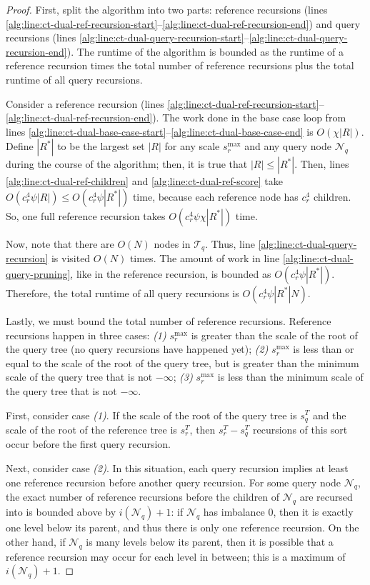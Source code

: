 \begin{proof}
First, split the algorithm into two parts: reference recursions (lines
\ref{alg:line:ct-dual-ref-recursion-start}--\ref{alg:line:ct-dual-ref-recursion-end})
and query recursions (lines
\ref{alg:line:ct-dual-query-recursion-start}--\ref{alg:line:ct-dual-query-recursion-end}).
The runtime of the algorithm is bounded as the runtime of a reference recursion
times the total number of reference recursions plus the total runtime of all
query recursions.

Consider a reference recursion (lines
\ref{alg:line:ct-dual-ref-recursion-start}--\ref{alg:line:ct-dual-ref-recursion-end}).
The work done in the base case loop from lines
\ref{alg:line:ct-dual-base-case-start}--\ref{alg:line:ct-dual-base-case-end} is
$O(\chi | R |)$.  Define $| R^* |$ to be the largest set $|R|$ for any scale
$s_r^{\max}$ and any query node $\mathscr{N}_q$ during the course of the
algorithm; then, it is true that $| R | \le | R^* |$.
%
Then, lines \ref{alg:line:ct-dual-ref-children} and
\ref{alg:line:ct-dual-ref-score} take $O(c_r^4 \psi | R |) \le O(c_r^4 \psi |
R^* |)$ time, because each reference node has $c_r^4$ children.  So, one
full reference recursion takes $O(c_r^4 \psi \chi | R^* |)$ time.

Now, note that there are $O(N)$ nodes in $\mathscr{T}_q$.  Thus, line
\ref{alg:line:ct-dual-query-recursion} is visited $O(N)$ times.  The amount of
work in line \ref{alg:line:ct-dual-query-pruning}, like in the reference
recursion, is bounded as $O(c_r^4 \psi | R^* |)$. Therefore, the total
runtime of all query recursions is $O(c_r^4 \psi | R^* | N)$.

Lastly, we must bound the total number of reference recursions.  Reference
recursions happen in three cases: \textit{(1)} $s_r^{\max}$ is greater than the
scale of the root of the query tree (no query recursions have happened yet);
\textit{(2)} $s_r^{\max}$ is less than or equal to the scale of the root of the
query tree, but is greater than the minimum scale of the query tree that is not
$-\infty$; \textit{(3)} $s_r^{\max}$ is less than the minimum scale of the query
tree that is not $-\infty$.

First, consider case \textit{(1)}.  If the scale of the root of the query tree
is $s_q^T$ and the scale of the root of the reference tree is $s_r^T$, then
$s_r^T - s_q^T$ recursions of this sort occur before the first query recursion.

Next, consider case \textit{(2)}.  In this situation, each query recursion
implies at least one reference recursion before another query recursion.  For
some query node $\mathscr{N}_q$, the
exact number of reference recursions before the children of $\mathscr{N}_q$ are
recursed into is bounded above by $i(\mathscr{N}_q) + 1$: if $\mathscr{N}_q$ has
imbalance $0$, then it is exactly one level below its parent, and thus there is
only one reference recursion.  On the other hand, if $\mathscr{N}_q$ is many
levels below its parent, then it is possible that a reference recursion may
occur for each level in between; this is a maximum of $i(\mathscr{N}_q) + 1$.


\end{proof}
